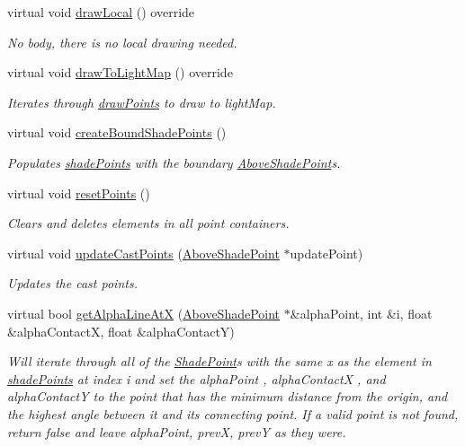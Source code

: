 \begin{DoxyCompactItemize}
virtual void \hyperlink{classlighting_1_1AboveLightSource_af858515032138900888d8db1a5f6812d}{draw\+Local} () override
\begin{DoxyCompactList}\small\item\em No body, there is no local drawing needed. \end{DoxyCompactList}\item 
virtual void \hyperlink{classlighting_1_1AboveLightSource_ae941abaa5da73f24c11d1e2c120af9ae}{draw\+To\+Light\+Map} () override
\begin{DoxyCompactList}\small\item\em Iterates through \hyperlink{classlighting_1_1AboveLightSource_a225b94f0f210561668b94e412c66443b}{draw\+Points} to draw to light\+Map. \end{DoxyCompactList}\item 
virtual void \hyperlink{classlighting_1_1AboveLightSource_a3625f4a181c5a2e78bc8549491e4e683}{create\+Bound\+Shade\+Points} ()
\begin{DoxyCompactList}\small\item\em Populates \hyperlink{classlighting_1_1AboveLightSource_a255e98bb6aae0099178cb7aa2d9671a5}{shade\+Points} with the boundary \hyperlink{classlighting_1_1AboveShadePoint}{Above\+Shade\+Point}s. \end{DoxyCompactList}\item 
virtual void \hyperlink{classlighting_1_1AboveLightSource_acc4e52dba4a3c64994b238f03b57df08}{reset\+Points} ()
\begin{DoxyCompactList}\small\item\em Clears and deletes elements in all point containers. \end{DoxyCompactList}\item 
virtual void \hyperlink{classlighting_1_1AboveLightSource_a86df533c28394981eb877e78fea594fb}{update\+Cast\+Points} (\hyperlink{classlighting_1_1AboveShadePoint}{Above\+Shade\+Point} $\ast$update\+Point)
\begin{DoxyCompactList}\small\item\em Updates the cast points. \end{DoxyCompactList}\item 
virtual bool \hyperlink{classlighting_1_1AboveLightSource_aa4fe1a6e9a19287417d66c911b98d0d0}{get\+Alpha\+Line\+AtX} (\hyperlink{classlighting_1_1AboveShadePoint}{Above\+Shade\+Point} $\ast$\&alpha\+Point, int \&i, float \&alpha\+ContactX, float \&alpha\+ContactY)
\begin{DoxyCompactList}\small\item\em Will iterate through all of the \hyperlink{classlighting_1_1ShadePoint}{Shade\+Point}s with the same x as the element in \hyperlink{classlighting_1_1AboveLightSource_a255e98bb6aae0099178cb7aa2d9671a5}{shade\+Points} at index {\itshape i}  and set the {\itshape alpha\+Point} , {\itshape alpha\+ContactX} , and {\itshape alpha\+ContactY}  to the point that has the minimum distance from the origin, and the highest angle between it and its connecting point. If a valid point is not found, return false and leave alpha\+Point, prevX, prevY as they were. \end{DoxyCompactList}\item 

\end{DoxyCompactItemize}
